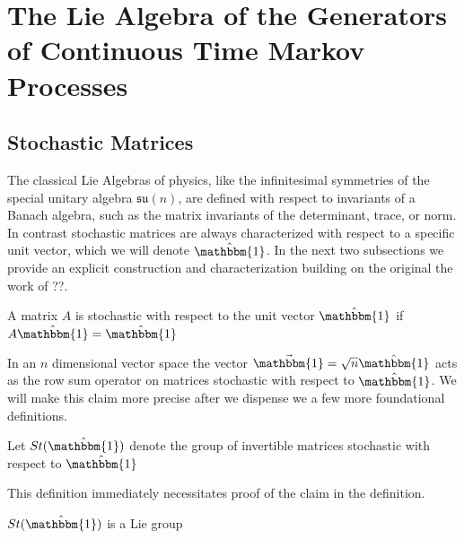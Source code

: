 \chapter{The Lie Algebra of the Generators of Continuous Time Markov Processes}
\section{Stochastic Matrices}
The classical Lie Algebras of physics, like the infinitesimal symmetries
of the special unitary algebra $\mathfrak{su}(n)$, are defined with respect to
invariants of a Banach algebra, such as the matrix invariants of the 
determinant, trace, or norm. In contrast stochastic matrices are always 
characterized with respect to a specific unit vector, which we will denote 
$\hat{\mathbbm{1}}$. In the next two subsections we provide an explicit 
construction and characterization building on the original the work of ??.

\begin{definition}
	A matrix $A$ is stochastic with respect to the unit vector $\hat{\mathbbm{1}}$ 
	if $A \hat{\mathbbm{1}} = \hat{\mathbbm{1}}$
\end{definition}

In an $n$ dimensional vector space the vector $\vec{\mathbbm{1}} = \sqrt{n} \hat{\mathbbm{1}}$ 
acts as the row sum operator on matrices stochastic with respect to $\hat{\mathbbm{1}}$. 
We will make this claim more precise after we dispense we a few more 
foundational definitions.

\begin{definition}
	Let $St(\hat{\mathbbm{1}})$ denote the group of invertible matrices 
	stochastic with respect to $\hat{\mathbbm{1}}$
\end{definition}

This definition immediately necessitates proof of the claim in the definition.

\begin{lemma}
	$St(\hat{\mathbbm{1}})$ is a Lie group
\end{lemma}

